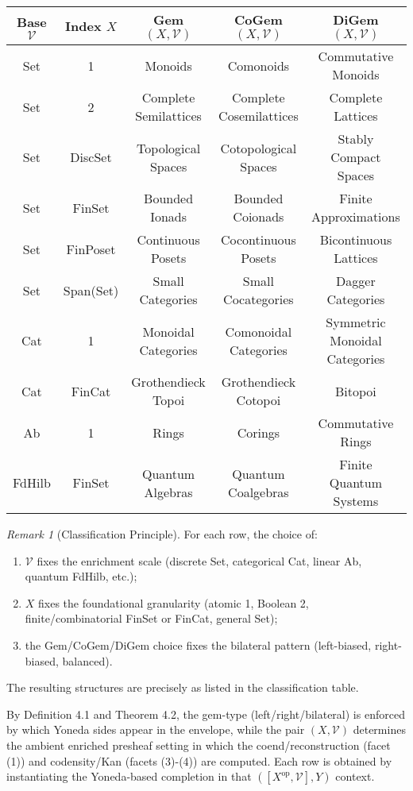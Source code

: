 \documentclass[11pt]{article}
\theoremstyle{plain}
\theoremstyle{definition}
\theoremstyle{remark}
\newtheorem{remark}[theorem]{Remark}
\newcommand{\V}{\mathcal{V}}
\newcommand{\op}{\mathrm{op}}
\begin{document}
\begin{center}
\renewcommand{\arraystretch}{1.5}
\begin{tabular}{|c|c|c|c|c|}
\hline
\textbf{Base $\V$} & \textbf{Index $X$} & \textbf{Gem$(X, \V)$} & \textbf{CoGem$(X, \V)$} & \textbf{DiGem$(X, \V)$} \\
\hline
Set & 1 & Monoids & Comonoids & Commutative Monoids \\
\hline
Set & 2 & Complete Semilattices & Complete Cosemilattices & Complete Lattices \\
\hline
Set & DiscSet & Topological Spaces & Cotopological Spaces & Stably Compact Spaces \\
\hline
Set & FinSet & Bounded Ionads & Bounded Coionads & Finite Approximations \\
\hline
Set & FinPoset & Continuous Posets & Cocontinuous Posets & Bicontinuous Lattices \\
\hline
Set & Span(Set) & Small Categories & Small Cocategories & Dagger Categories \\
\hline
Cat & 1 & Monoidal Categories & Comonoidal Categories & Symmetric Monoidal Categories \\
\hline
Cat & FinCat & Grothendieck Topoi & Grothendieck Cotopoi & Bitopoi \\
\hline
Ab & 1 & Rings & Corings & Commutative Rings \\
\hline
FdHilb & FinSet & Quantum Algebras & Quantum Coalgebras & Finite Quantum Systems \\
\hline
\end{tabular}
\end{center}

\begin{remark}[Classification Principle]
For each row, the choice of:
\begin{enumerate}
\item $\V$ fixes the enrichment scale (discrete Set, categorical Cat, linear Ab, quantum FdHilb, etc.);
\item $X$ fixes the foundational granularity (atomic 1, Boolean 2, finite/combinatorial FinSet or FinCat, general Set);
\item the Gem/CoGem/DiGem choice fixes the bilateral pattern (left-biased, right-biased, balanced).
\end{enumerate}

The resulting structures are precisely as listed in the classification table.

By Definition 4.1 and Theorem 4.2, the gem-type (left/right/bilateral) is enforced by which Yoneda sides appear in the envelope, while the pair $(X, \V)$ determines the ambient enriched presheaf setting in which the coend/reconstruction (facet (1)) and codensity/Kan (facets (3)-(4)) are computed. Each row is obtained by instantiating the Yoneda-based completion in that $([X^{\op}, \V], Y)$ context.
\end{remark}
\end{document}
